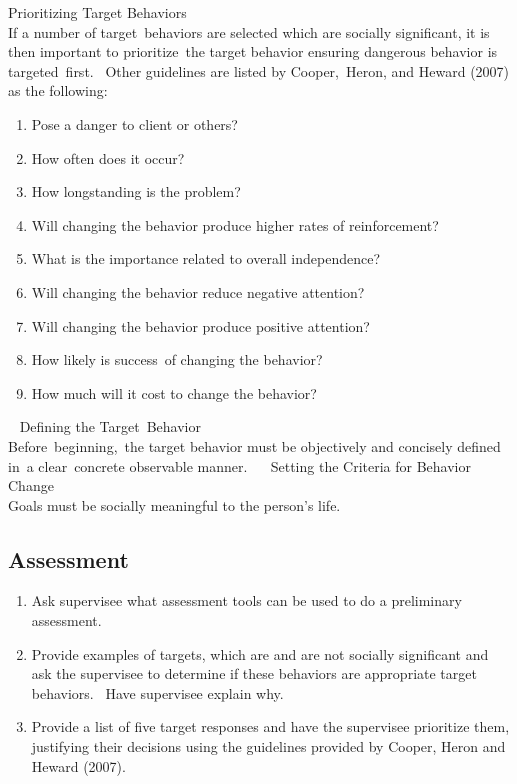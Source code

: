 Prioritizing Target Behaviors\\
If a number of target behaviors are selected which are socially significant, it is then important to prioritize the target behavior ensuring dangerous behavior is targeted first.  Other guidelines are listed by Cooper, Heron, and Heward (2007) as the following: 
\begin{enumerate}
\item Pose a danger to client or others? 
\item How often does it occur? 
\item How longstanding is the problem? 
\item Will changing the behavior produce higher rates of reinforcement? 
\item What is the importance related to overall independence? 
\item Will changing the behavior reduce negative attention? 
\item Will changing the behavior produce positive attention? 
\item How likely is success of changing the behavior? 
\item How much will it cost to change the behavior? 
\end{enumerate}
 
Defining the Target Behavior\\
Before beginning, the target behavior must be objectively and concisely defined in a clear concrete observable manner. 
 
Setting the Criteria for Behavior Change \\
Goals must be socially meaningful to the person's life.   
%
\subsection{Assessment}
\begin{enumerate}
\item Ask supervisee what assessment tools can be used to do a preliminary assessment. 
\item Provide examples of targets, which are and are not socially significant and ask the supervisee to determine if these behaviors are appropriate target behaviors.  Have supervisee explain why. 
\item Provide a list of five target responses and have the supervisee prioritize them, justifying their decisions using the guidelines provided by Cooper, Heron and Heward (2007).
\end{enumerate}
%
